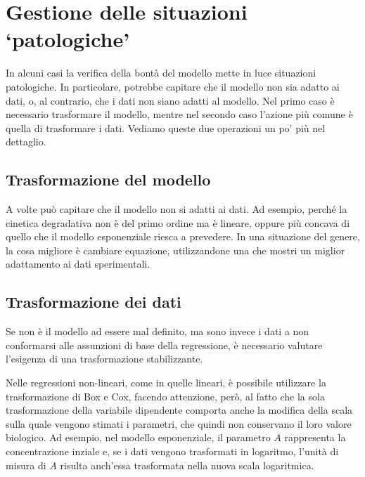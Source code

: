 \documentclass[a4paper,12pt,oneside]{book}
\begin{document}
\hypertarget{gestione-delle-situazioni-patologiche}{%
\section{Gestione delle situazioni `patologiche'}\label{gestione-delle-situazioni-patologiche}}

In alcuni casi la verifica della bontà del modello mette in luce situazioni patologiche. In particolare, potrebbe capitare che il modello non sia adatto ai dati, o, al contrario, che i dati non siano adatti al modello. Nel primo caso è necessario trasformare il modello, mentre nel secondo caso l'azione più comune è quella di trasformare i dati. Vediamo queste due operazioni un po' più nel dettaglio.

\hypertarget{trasformazione-del-modello}{%
\subsection{Trasformazione del modello}\label{trasformazione-del-modello}}

A volte può capitare che il modello non si adatti ai dati. Ad esempio, perché la cinetica degradativa non è del primo ordine ma è lineare, oppure più concava di quello che il modello esponenziale riesca a prevedere. In una situazione del genere, la cosa migliore è cambiare equazione, utilizzandone una che mostri un miglior adattamento ai dati sperimentali.

\hypertarget{trasformazione-dei-dati}{%
\subsection{Trasformazione dei dati}\label{trasformazione-dei-dati}}

Se non è il modello ad essere mal definito, ma sono invece i dati a non conformarsi alle assunzioni di base della regressione, è necessario valutare l'esigenza di una trasformazione stabilizzante.

Nelle regressioni non-lineari, come in quelle lineari, è possibile utilizzare la trasformazione di Box e Cox, facendo attenzione, però, al fatto che la sola trasformazione della variabile dipendente comporta anche la modifica della scala sulla quale vengono stimati i parametri, che quindi non conservano il loro valore biologico. Ad esempio, nel modello esponenziale, il parametro \(A\) rappresenta la concentrazione inziale e, se i dati vengono trasformati in logaritmo, l'unità di misura di \(A\) risulta anch'essa trasformata nella nuova scala logaritmica.
\end{document}
